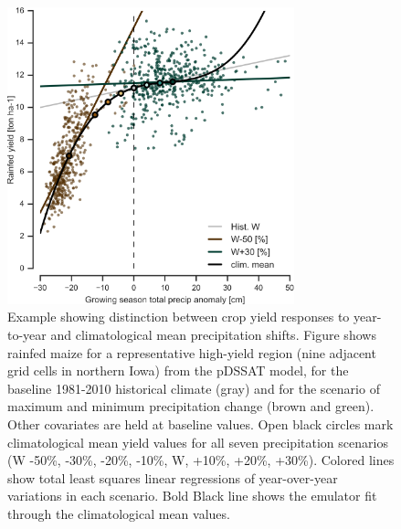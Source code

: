 \documentclass[gmd, manuscript]{copernicus} %
\begin{document}
\begin{figure}[ht]
\centering
   \includegraphics[width=8.3cm]{figures/pryearvclim.png}
   \caption{Example showing distinction between crop yield responses to year-to-year and climatological mean precipitation shifts. 
   Figure shows rainfed maize for a representative high-yield region (nine adjacent grid cells in northern Iowa) from the pDSSAT model, for the baseline 1981-2010 historical climate (gray) and for the scenario of maximum and minimum precipitation change (brown and green). 
   Other covariates are held at baseline values.
   Open black circles mark climatological mean yield values for all seven precipitation scenarios (W -50\%, -30\%, -20\%, -10\%, W, +10\%, +20\%, +30\%). 
   Colored lines show total least squares linear regressions of year-over-year variations in each scenario. 
   Bold Black line shows the emulator fit through the climatological mean values.}
   \label{fig:yearvclimpr}
\end{figure}
\end{document}
